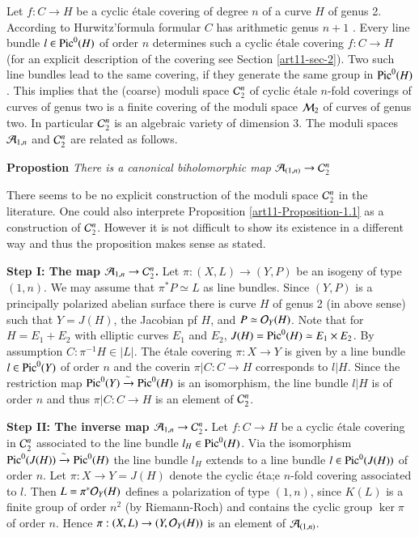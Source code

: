 Let $f: C\rightarrow H$ be a cyclic \'etale covering of degree $n$ of a curve $H$ of genus 2. According to Hurwitz'formula formular $C$ has arithmetic genus $n+1$ . Every line bundle $l \in \operatorname{Pic}^{0}(H)$ of order $n$ determines such a
cyclic \'etale covering $f: C\rightarrow H$ (for an explicit description of the  covering see Section \ref{art11-sec-2}). Two such line bundles lead to the same covering, if they generate the same group in $\operatorname{Pic}^{0}(H)$. This implies that the (coarse) moduli space $\mathcal{C}_{2}^{n}$ of cyclic \'etale $n$-fold coverings of curves of genus two is a finite covering of the moduli space $\mathcal{M}_{2}$ of curves of genus two. In particular $\mathcal{C}_{2}^{n}$ is an algebraic variety of dimension 3. The moduli spaces $\mathcal{A}_{1,n}$ and $\mathcal{C}_{2}^{n}$ are related as follows.

\medskip
\noindent
{\bfseries {} Propostion\label{art11-Proposition-1.1}} \textit{There is a canonical biholomorphic map} $\mathcal{A}_{(1,n)} \rightarrow \mathcal{C}_{2}^{n}$

There seems to be no explicit construction of the moduli space $\mathcal{C}_{2}^{n}$ in the literature. One could also interprete Proposition \ref{art11-Proposition-1.1} as a construction of $\mathcal{C}_{2}^{n}$. However it is not difficult to show its existence in a different way and thus the proposition makes sense as stated.

\medskip
\noindent
{\bfseries Step I: The map $\mathcal{A}_{1,n}\rightarrow \mathcal{C}_{2}^{n}$.} Let $\pi : (X, L)\rightarrow (Y,P)$ be an isogeny of type $(1,n)$. We may assume that $\pi^{*} P\simeq L$ as line bundles. Since $(Y, P)$ is a principally polarized abelian surface there is curve $H$ of genus 2 (in above sense) such that $Y=J(H)$, the Jacobian pf $H$, and $P\simeq\mathcal{O}_{Y}(H)$. Note that for $H=E_{1} + E_{2}$ with elliptic curves $E_{1}$ and $E_{2}$, $J(H) = \operatorname{Pic}^{0}(H) \simeq E_{1}\times E_{2}$. By assumption $C : \pi^{-1}H \in |L|$. The \'etale covering $\pi : X \rightarrow Y$ is given by a line bundle $l \in \operatorname{Pic}^{0}(Y)$ of order $n$ and the coverin $\pi |C:C \rightarrow H$ corresponds to $l|H$. Since the restriction map $\operatorname{Pic}^{0}(Y) \xrightarrow{\sim} \operatorname{Pic}^{0}(H)$ is an isomorphism, the line bundle $l|H$ is of order $n$ and thus $\pi|C:C \rightarrow H$ is an element of $\mathcal{C}_{2}^{n}$.

\medskip
\noindent
{\bfseries Step II: The inverse map $\mathcal{A}_{1,n}\rightarrow \mathcal{C}_{2}^{n}$.} 
Let $f: C\rightarrow H$ be a cyclic \'etale covering in $\mathcal{C}_{2}^{n}$ associated to the line bundle $l_{H} \in \operatorname{Pic}^{0}(H)$. Via the isomorphism $\operatorname{Pic}^{0}(J(H)) \xrightarrow{\sim} \operatorname{Pic}^{0}(H)$ the line bundle $l_{H}$ extends to a line bundle $l \in \operatorname{Pic}^{0}(J(H))$ of order $n$. Let $\pi : X \rightarrow Y = J(H)$ denote the cyclic \'eta;e $n$-fold covering associated to $l$. Then $L=\pi^{*}\mathcal{O}_{Y}(H)$ defines a polarization of type $(1,n)$, since $K(L)$ is a finite group of order $n^{2}$ (by Riemann-Roch) and contains the cyclic group $\ker \pi$ of order $n$. Hence $\pi : (X, L) \rightarrow (Y, \mathcal{O}_{Y}(H))$ is an element of $\mathcal{A}_{(1,n)}$.

